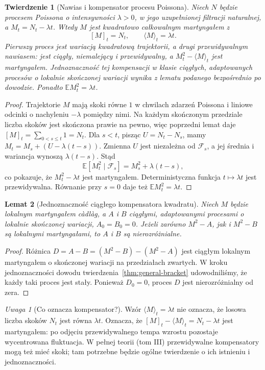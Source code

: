 \documentclass[11pt,a4paper,oneside]{report}
\numberwithin{equation}{chapter}
\theoremstyle{plain}
\newtheorem{twierdzenie}{Twierdzenie}[chapter]
\newtheorem{lemat}[twierdzenie]{Lemat}
\theoremstyle{definition}
\theoremstyle{remark}
\newtheorem{uwaga}{Uwaga}[chapter]
\newcommand{\E}{\mathbb{E}}
\newcommand{\calF}{\mathcal{F}}
\begin{document}
\begin{twierdzenie}[Nawias i kompensator procesu Poissona]
Niech $N$ będzie procesem Poissona o intensywności
$\lambda>0$, w jego uzupełnionej filtracji naturalnej,
a $M_t=N_t-\lambda t$. Wtedy $M$ jest kwadratowo
całkowalnym martyngałem z
\[
[M]_t=N_t,\qquad \langle M\rangle_t=\lambda t.
\]
Pierwszy proces jest wariacją kwadratową trajektorii,
a drugi \emph{przewidywalnym nawiasem}: jest ciągły,
niemalejący i przewidywalny, a $M_t^2-\langle M\rangle_t$
jest martyngałem. Jednoznaczność tej kompensacji w klasie ciągłych,
adaptowanych procesów o lokalnie skończonej wariacji
wynika z lematu podanego bezpośrednio po dowodzie.
Ponadto $\E M_t^2=\lambda t$.
\end{twierdzenie}
\begin{proof}
Trajektorie $M$ mają skoki równe $1$ w chwilach
zdarzeń Poissona i liniowe odcinki o nachyleniu
$-\lambda$ pomiędzy nimi. Na każdym skończonym
przedziale liczba skoków jest skończona prawie na pewno,
więc poprzedni lemat daje
$[M]_t=\sum_{0<s\le t}1=N_t$.
Dla $s<t$, pisząc $U=N_t-N_s$, mamy
$M_t=M_s+(U-\lambda(t-s))$.
Zmienna $U$ jest niezależna od $\calF_s$, a jej
średnia i wariancja wynoszą $\lambda(t-s)$.
Stąd
\[
\E[M_t^2\mid\calF_s]
=M_s^2+\lambda(t-s),
\]
co pokazuje, że $M_t^2-\lambda t$ jest martyngałem.
Deterministyczna funkcja $t\mapsto\lambda t$ jest
przewidywalna. Równanie przy $s=0$ daje też
$\E M_t^2=\lambda t$.
\end{proof}


\begin{lemat}[Jednoznaczność ciągłego kompensatora kwadratu]
Niech $M$ będzie lokalnym martyngałem c\`adl\`ag, a $A$ i $B$
ciągłymi, adaptowanymi procesami o lokalnie skończonej wariacji,
$A_0=B_0=0$. Jeżeli zarówno $M^2-A$, jak i $M^2-B$
są lokalnymi martyngałami, to $A$ i $B$ są nierozróżnialne.
\end{lemat}
\begin{proof}
Różnica $D=A-B=(M^2-B)-(M^2-A)$ jest ciągłym
lokalnym martyngałem o skończonej wariacji na przedziałach
zwartych. W kroku jednoznaczności dowodu
twierdzenia~\ref{thm:general-bracket} udowodniliśmy, że
każdy taki proces jest stały. Ponieważ $D_0=0$,
proces $D$ jest nierozróżnialny od zera.
\end{proof}

\begin{uwaga}[Co oznacza kompensator?]
Wzór $\langle M\rangle_t=\lambda t$ nie oznacza,
że losowa liczba skoków $N_t$ jest równa $\lambda t$.
Oznacza, że $[M]_t-\langle M\rangle_t=N_t-\lambda t$
jest martyngałem: po odjęciu przewidywalnego tempa
wzrostu pozostaje wycentrowana fluktuacja.
W pełnej teorii (tom III) przewidywalne kompensatory
mogą też mieć skoki; tam potrzebne będzie ogólne
twierdzenie o ich istnieniu i jednoznaczności.
\end{uwaga}
\end{document}
